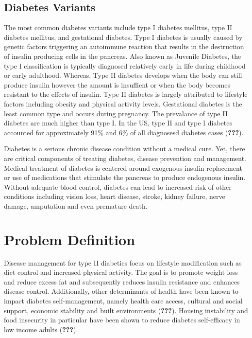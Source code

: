 \documentclass [11pt, proquest] {uwthesis}[2015/03/03]
\begin{document}
\subsection{Diabetes Variants}\label{diabetes-variants}

The most common diabetes variants include type I diabetes mellitus, type
II diabetes mellitus, and gestational diabetes. Type I diabetes is
usually caused by genetic factors triggering an autoimmune reaction that
results in the destruction of insulin producing cells in the pancreas.
Also known as Juvenile Diabetes, the type I classification is typically
diagnosed relatively early in life during childhood or early adulthood.
Whereas, Type II diabetes develops when the body can still produce
insulin however the amount is insuffient or when the body becomes
resistant to the effects of insulin. Type II diabetes is largely
attributed to lifestyle factors including obesity and physical activity
levels. Gestational diabetes is the least common type and occurs during
pregnancy. The prevalance of type II diabetes are much higher than type
I. In the US, type II and type I diabetes accounted for approximately
91\% and 6\% of all diagnosesd diabetes cases ({\textbf{???}}).

Diabetes is a serious chronic disease condition without a medical cure.
Yet, there are critical components of treating diabetes, disease
prevention and management. Medical treatment of diabetes is centered
around exogenous insulin replacement or use of medications that
stimulate the pancreas to produce endogenous insulin. Without adequate
blood control, diabetes can lead to increased risk of other conditions
including vision loss, heart disease, stroke, kidney failure, nerve
damage, amputation and even premature death.

\section{Problem Definition}\label{problem-definition}

Disease management for type II diabetics focus on lifestyle modification
such as diet control and increased physical activity. The goal is to
promote weight loss and reduce excess fat and subsequently reduces
insulin resistance and enhances disease control. Additionally, other
determinants of health have been known to impact diabetes
self-management, namely health care access, cultural and social support,
economic stability and built environments ({\textbf{???}}). Housing
instability and food insecurity in particular have been shown to reduce
diabetes self-efficacy in low income adults ({\textbf{???}}).
\end{document}
